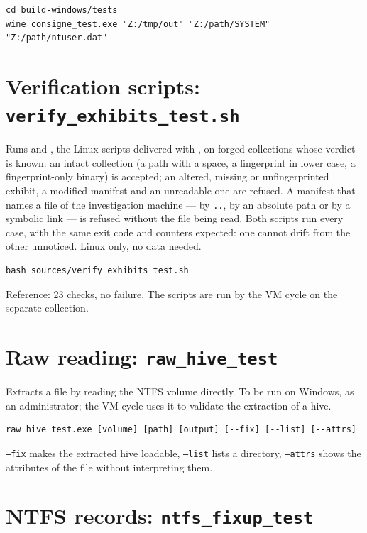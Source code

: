 \documentclass[11pt,a4paper,oneside]{report}
\begin{document}
\begin{lstlisting}
cd build-windows/tests
wine consigne_test.exe "Z:/tmp/out" "Z:/path/SYSTEM" "Z:/path/ntuser.dat"
\end{lstlisting}

\section{Verification scripts: \texttt{verify\_exhibits\_test.sh}}

Runs  and , the
Linux scripts delivered with , on forged collections whose
verdict is known: an intact collection (a path with a space, a fingerprint in
lower case, a fingerprint-only binary) is accepted; an altered, missing or
unfingerprinted exhibit, a modified manifest and an unreadable one are refused.
A manifest that names a file of the investigation machine — by \texttt{..}, by
an absolute path or by a symbolic link — is refused without the file being
read. Both scripts run every case, with the same exit code and counters
expected: one cannot drift from the other unnoticed. Linux only, no data
needed.

\begin{lstlisting}
bash sources/verify_exhibits_test.sh
\end{lstlisting}

Reference: 23 checks, no failure. The  scripts are run by the
VM cycle on the separate collection.

\section{Raw reading: \texttt{raw\_hive\_test}}

Extracts a file by reading the NTFS volume directly. To be run on Windows, as an
administrator; the VM cycle uses it to validate the extraction of a hive.

\begin{lstlisting}
raw_hive_test.exe [volume] [path] [output] [--fix] [--list] [--attrs]
\end{lstlisting}

\texttt{--fix} makes the extracted hive loadable, \texttt{--list} lists a
directory, \texttt{--attrs} shows the  attributes of the file
without interpreting them.

\section{NTFS records: \texttt{ntfs\_fixup\_test}}
\end{document}
